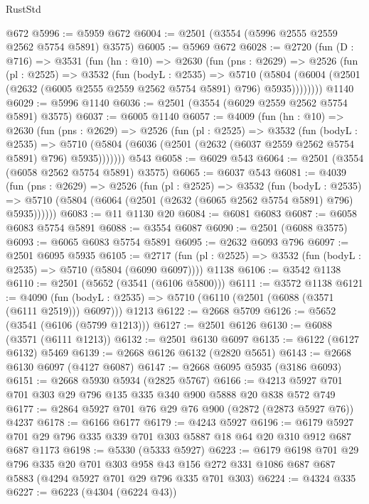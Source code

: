 \begin{lexlean}{RustStd}
\begin{coremodule}
{\begin{coremodule}
{{{{{{{{{{{{{{{{{{{{    @672
@5996 := @5959 @672
@6004 := @2501 (@3554 (@5996 @2555 @2559 @2562 @5754 @5891) @3575)
@6005 := @5969 @672
@6028 := @2720
    (fun (D : @716) =>
    @3531
      (fun (hn : @10) =>
      @2630
        (fun (pns : @2629) =>
        @2526
          (fun (pl : @2525) =>
          @3532
            (fun (bodyL : @2535) =>
            @5710
              (@5804 (@6004 (@2501 (@2632 (@6005 @2555 @2559 @2562 @5754 @5891) @796) @5935))))))))
    @1140
@6029 := @5996 @1140
@6036 := @2501 (@3554 (@6029 @2559 @2562 @5754 @5891) @3575)
@6037 := @6005 @1140
@6057 := @4009
    (fun (hn : @10) =>
    @2630
      (fun (pns : @2629) =>
      @2526
        (fun (pl : @2525) =>
        @3532
          (fun (bodyL : @2535) =>
          @5710 (@5804 (@6036 (@2501 (@2632 (@6037 @2559 @2562 @5754 @5891) @796) @5935)))))))
    @543
@6058 := @6029 @543
@6064 := @2501 (@3554 (@6058 @2562 @5754 @5891) @3575)
@6065 := @6037 @543
@6081 := @4039
    (fun (pns : @2629) =>
    @2526
      (fun (pl : @2525) =>
      @3532
        (fun (bodyL : @2535) =>
        @5710 (@5804 (@6064 (@2501 (@2632 (@6065 @2562 @5754 @5891) @796) @5935))))))
@6083 := @11 @1130 @20
@6084 := @6081 @6083
@6087 := @6058 @6083 @5754 @5891
@6088 := @3554 @6087
@6090 := @2501 (@6088 @3575)
@6093 := @6065 @6083 @5754 @5891
@6095 := @2632 @6093 @796
@6097 := @2501 @6095 @5935
@6105 := @2717
    (fun (pl : @2525) => @3532 (fun (bodyL : @2535) => @5710 (@5804 (@6090 @6097))))
    @1138
@6106 := @3542 @1138
@6110 := @2501 (@5652 (@3541 (@6106 @5800)))
@6111 := @3572 @1138
@6121 := @4090
    (fun (bodyL : @2535) => @5710 (@6110 (@2501 (@6088 (@3571 (@6111 @2519))) @6097)))
    @1213
@6122 := @2668 @5709
@6126 := @5652 (@3541 (@6106 (@5799 @1213)))
@6127 := @2501 @6126
@6130 := @6088 (@3571 (@6111 @1213))
@6132 := @2501 @6130 @6097
@6135 := @6122 (@6127 @6132) @5469
@6139 := @2668 @6126 @6132 (@2820 @5651)
@6143 := @2668 @6130 @6097 (@4127 @6087)
@6147 := @2668 @6095 @5935 (@3186 @6093)
@6151 := @2668 @5930 @5934 (@2825 @5767)
@6166 := @4213 @5927 @701 @701 @303 @29 @796 @135 @335 @340 @900 @5888 @20 @838 @572 @749
@6177 := @2864 @5927 @701 @76 @29 @76 @900 (@2872 (@2873 @5927 @76)) @4237
@6178 := @6166 @6177
@6179 := @4243 @5927
@6196 := @6179 @5927 @701 @29 @796 @335 @339 @701 @303 @5887 @18 @64 @20 @310 @912 @687 @687 @1173
@6198 := @5330 (@5333 @5927)
@6223 := @6179
    @6198
    @701
    @29
    @796
    @335
    @20
    @701
    @303
    @958
    @43
    @156
    @272
    @331
    @1086
    @687
    @687
    @5883
    (@4294 @5927 @701 @29 @796 @335 @701 @303)
@6224 := @4324 @335
@6227 := @6223 (@4304 (@6224 @43))
}}}}}}}}}}}}}}}}}}}}
\end{coremodule}}
\end{coremodule}
\end{lexlean}
